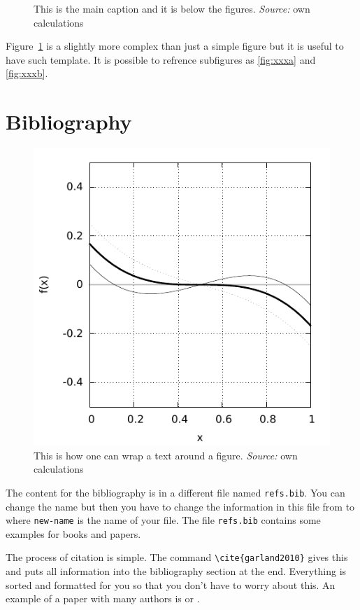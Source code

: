 \documentclass[english, twoside, 12pt, a4paper]{article}
\theoremstyle{definition}
\theoremstyle{plain}
\theoremstyle{remark}
\begin{document}
\begin{figure}[hbt]
  \captionsetup{margin=10pt,font=small,labelfont=bf,width=.8\textwidth}

  \caption[Short caption 2]{This is the main caption and it is below the figures. \textit{Source:} own calculations}\label{fig:xxx}
\end{figure}

Figure~\ref{fig:xxx} is a slightly more complex than just a simple figure but it is useful to have such template. It is possible to refrence subfigures as \ref{fig:xxxa} and \ref{fig:xxxb}.

\clearpage
\section{Bibliography}

\begin{figure}
\centering

\includegraphics[width=.4\textwidth]{figure-2}

\captionsetup{margin=10pt,font=small,labelfont=bf,width=.42\textwidth}

  \caption[Short caption 2]{This is how one can wrap a text around a figure. \textit{Source:} own calculations}\label{fig:yyy}


\end{figure}

The content for the bibliography is in a different file named \verb+refs.bib+. You can change the name but then you have to change the information in this file from \verb++ to \verb++ where \verb+new-name+ is the name of your file. The file \verb+refs.bib+ contains some examples for books and papers.

The process of citation is simple. The command  \verb+\cite{garland2010}+ gives this \cite{garland2010} and puts all information into the bibliography section  at the end. Everything is sorted and formatted for you so that you don't have to worry about this. An example of a paper with many authors is \cite{benaim2003} or \cite{osborne1998}. 
\end{document}
